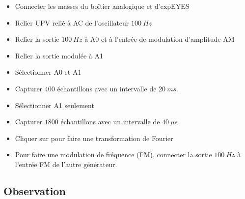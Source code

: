 \documentclass{book}
\begin{document}
\begin{itemize}
  \item Connecter les masses du boîtier analogique et d'expEYES
  \item Relier UPV relié à AC de l'oscillateur $100\ Hz$
  \item Relier la sortie $100\ Hz$ à A0 et à l'entrée de modulation d'amplitude AM
  \item Relier la sortie modulée à A1
  \item Sélectionner A0 et A1
  \item Capturer $400$ échantillons avec un intervalle de $20\ ms$.
  \item Sélectionner A1 seulement
  \item Capturer $1800$ échantillons avec un intervalle de $40\ \mu s$
  \item Cliquer sur   pour faire une transformation de Fourier
  \item Pour faire une modulation de fréquence (FM), connecter la sortie $100\ Hz$ à l'entrée FM de l'autre générateur.
\end{itemize}

\subsection{Observation}
\end{document}
